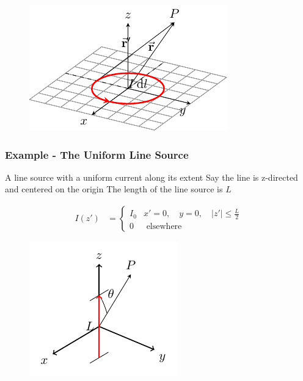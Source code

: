 \documentclass[10pt, compress]{beamer}
\begin{document}
\begin{frame}

  \begin{figure}
    \centering
    \includegraphics[width=.4\textwidth]{circular.pdf}
  \end{figure}
\end{frame}

\begin{frame}
  \frametitle{Example - The Uniform Line Source}
  \begin{outline}
    \1 A line source with a uniform current along its extent
    \1 Say the line is z-directed and centered on the origin
    \1 The length of the line source is $L$
  \end{outline}
  \begin{align*}
    I (z') & =\left\{\begin{array}{ll}
      I_{0} & x'=0, \quad y=0, \quad |z'| \leq \frac{L}{2} \\
      0     & \text { elsewhere }
    \end{array}\right.
  \end{align*}
  \begin{figure}[t!]
    \centering
    \includegraphics[width=.4\textwidth]{line_source.pdf}
  \end{figure}
\end{frame}
\end{document}
